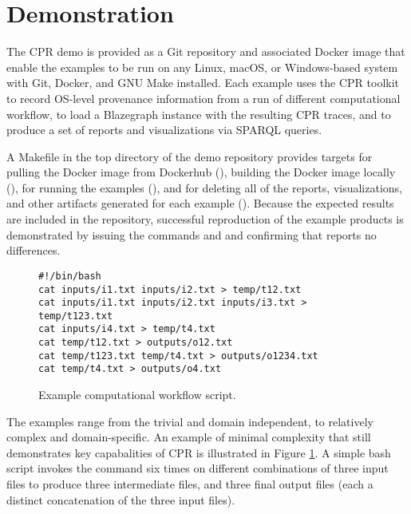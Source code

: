 \section{Demonstration}

The CPR demo is provided as a Git repository and associated Docker image that enable the examples to be run on any Linux, macOS, or Windows-based system with Git, Docker, and GNU Make installed.  Each example uses the CPR toolkit to record OS-level provenance information from a run of different computational workflow, to load a Blazegraph instance with the resulting CPR traces, and to produce a set of reports and visualizations via SPARQL queries.
 
A Makefile in the top directory of the demo repository provides targets for pulling the Docker image from Dockerhub (), building the Docker image locally (), for running the examples (), and for deleting all of the reports, visualizations, and other artifacts generated for each example (). Because the expected results are included in the repository, successful reproduction of the example products is demonstrated by issuing the commands  and  and confirming that  reports no differences.

\begin{figure}
    \begin{lstlisting}
#!/bin/bash
cat inputs/i1.txt inputs/i2.txt > temp/t12.txt
cat inputs/i1.txt inputs/i2.txt inputs/i3.txt > temp/t123.txt
cat inputs/i4.txt > temp/t4.txt
cat temp/t12.txt > outputs/o12.txt
cat temp/t123.txt temp/t4.txt > outputs/o1234.txt
cat temp/t4.txt > outputs/o4.txt
    \end{lstlisting}
    \caption{Example computational workflow script.}
    \label{fig:cpr-example}
\end{figure}

The examples range from the trivial and domain independent, to relatively complex and domain-specific.  An example of minimal complexity that still demonstrates key capabalities of CPR is illustrated in Figure \ref{fig:cpr-example}. A simple bash script invokes the  command six times on different combinations of three input files to produce three intermediate files, and three final output files (each a distinct concatenation of the three input files).  


